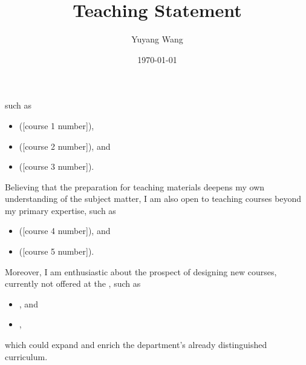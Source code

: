 



\title{Teaching Statement}

\def\courseOneName{[course 1 name]}
\def\courseOneNumber{[course 1 number]}
\def\courseTwoName{[course 2 name]}
\def\courseTwoNumber{[course 2 number]}
\def\courseThreeName{[course 3 name]}
\def\courseThreeNumber{[course 3 number]}
\def\courseFourName{[course 4 name]}
\def\courseFourNumber{[course 4 number]}
\def\courseFiveName{[course 5 name]}
\def\courseFiveNumber{[course 5 number]}
\def\courseSixName{[course 6 name]}
\def\courseSixNumber{[course 6 number]}
\def\courseSevenName{[course 7 name]}
\def\courseSevenNumber{[course 7 number]}

\def\rsCustom{%
such as
\begin{itemize}[nosep]
    \item \courseOneName{} (\courseOneNumber{}),
    \item \courseTwoName{} (\courseTwoNumber{}), and
    \item \courseThreeName{} (\courseThreeNumber{}).
\end{itemize}
Believing that the preparation for teaching materials deepens my own understanding of the subject matter, I am also open to teaching courses beyond my primary expertise, such as
\begin{itemize}[nosep]
    \item \courseFourName{} (\courseFourNumber{}), and
    \item \courseFiveName{} (\courseFiveNumber{}).
\end{itemize}
Moreover, I am enthusiastic about the prospect of designing new courses, currently not offered at the \appSchool{}, such as
\begin{itemize}[nosep]
    \item \courseSixName{}, and 
    \item \courseSevenName{},
\end{itemize}
which could expand and enrich the department's already distinguished curriculum.
}

\author{Yuyang Wang}
\date{\today}
\makeatletter
\fancyfoot[L]{\scshape \MakeLowercase{\@author}}
\fancyfoot[R]{{\scshape \MakeLowercase{\@title}}\quad{\LARGE\sfrac{\thepage}{\pageref*{LastPage}}}}
\makeatother



\maketitle%
\thispagestyle{fancy}


\rsCustom{}


\footnotesize


